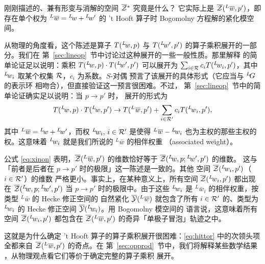 刚刚描述的、兼有形变与消解的空间 $\bar\EUZ{}^*$ 究竟是什么？
它实际上是 $\bar{\EUZ}(^L\bar w,p')$，即存在单个权为
$^L\bar w={}^L\negthinspace w+{}^L\negthinspace w'$ 的 't Hooft
算子时 Bogomolny 方程解的紧化模空间。

从物理的角度看，这个陈述是算子 $T(^L\negthinspace w,p)$ 与
$T(^L\negthinspace w',p')$ 的算子乘积展开的一部分。我们在
第~\ref{sec:lineop}~节中讨论过这种展开的一些一般性质。那里解释
的简单论证足以说明：乘积 $T(^L\negthinspace w,p)\cdot
T(^L\negthinspace w',p')$ 可以展开为
$\sum_{i\in \EUR}c_i T(^L\negthinspace w_i,p')$，其中
$^L\negthinspace w_i$ 取某个权集 $\EUR$，$c_i$ 为系数。$S$-对偶
预言了该展开的具体形式（它应当与 $^L\negthinspace G$ 的表示环
相吻合），但直接验证这一预言很困难。不过，
第~\ref{sec:lineop}~节中的简单论证确实足以说明：当 $p\to p'$ 时，
展开的形式为
\setcounter{equation}{19}
\begin{equation}\label{eq:hittor}
T({}^L\negthinspace w,p)\cdot T({}^L\negthinspace
w,p')\to T({}^L\bar w,p')+\sum_{i\in \EUR'} c_i
T({}^L\negthinspace w_i,p'),
\end{equation}
 其中 $^L\bar w={}^L\negthinspace
w+{}^L\negthinspace w'$，而权 $^L\negthinspace
w_i,\,i\in \EUR'$ 是使得 $^L\bar
w-{}^L\negthinspace w_i$ 也为主权的那些主权的权。这意味着
$^L\negthinspace w_i$ 就是我们所说的 $^L\bar w$ 的相伴权重
（associated weight）。

公式 \eqref{eq:xinon} 表明，$\bar\EUZ(^L\bar
w,p')$ 的维数恰好等于
$\bar\EUZ(^L\negthinspace w,p;{}^L\negthinspace w',p')$ 的维数。
这与「前者是后者在 $p\to p'$ 时的极限」这一陈述是一致的。其他
空间 $\bar\EUZ(^L\negthinspace w_i,p')$（$i\in \EUR'$）的维数
严格更小。事实上，在某种意义上，所有空间
$\bar\EUZ(^L\negthinspace w_i,p')$ 都出现在
$\bar\EUZ(^L\negthinspace w,p;{}^L\negthinspace w',p')$ 当
$p\to p'$ 时的极限中。由于这些 $^L\negthinspace w_i$ 是
$^L\bar w_i$ 的相伴权重，按类型 $^L\bar w$ 的 Hecke 修正空间的
自然紧化 $\bar {{\EUY}}(^L\bar w)$ 就包含了所有
$i\in \EUR'$ 的、类型为 $^L\negthinspace w_i$ 的 Hecke 修正空间
$\bar {{\EUY}}(^L\negthinspace w_i)$。用 Bogomolny 模空间的
语言说，这意味着所有空间
$\bar\EUZ(^L\negthinspace w_i,p')$ 都包含在
$\bar\EUZ(^L\bar w,p')$ 的奇异「单极子冒泡」轨迹之中。

这就是为什么确定 't Hooft 算子的算子乘积展开很困难：\eqref{eq:hittor}
中的次领头项全都来自 $\bar\EUZ(^L\bar w,p')$ 的奇点。在
第~\ref{sec:opprod}~节中，我们将解释某些数学结果
\cite{ref97,ref98}，从物理观点看它们等价于确定完整的算子乘积
展开。

